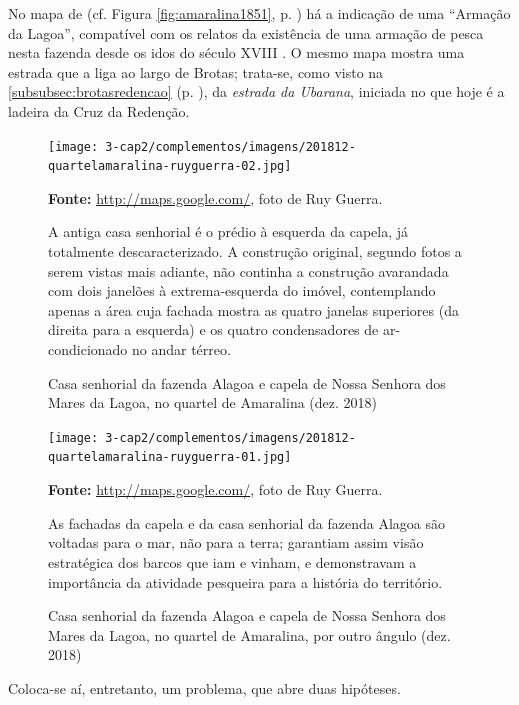 No mapa de  (cf. Figura \autoref{fig:amaralina1851}, p. \pageref{fig:amaralina1851}) há a indicação de uma ``Armação da Lagoa'', compatível com os relatos da existência de uma armação de pesca nesta fazenda desde os idos do século XVIII \cite[p.~120-121]{campos_alagoa_1942}. O mesmo mapa mostra uma estrada que a liga ao largo de Brotas; trata-se, como visto na \autoref{subsubsec:brotasredencao} (p. \pageref{subsubsec:brotasredencao}), da \textit{estrada da Ubarana}, iniciada no que hoje é a ladeira da Cruz da Redenção.

\begin{figure}
\caption{Casa senhorial da fazenda Alagoa e capela de Nossa Senhora dos Mares da Lagoa, no quartel de Amaralina (dez. 2018)}
\centering
\texttt{[image: 3-cap2/complementos/imagens/201812-quartelamaralina-ruyguerra-02.jpg]}{\footnotesize \par \textbf{Fonte:} \url{http://maps.google.com/}, foto de Ruy Guerra. \par A antiga casa senhorial é o prédio à esquerda da capela, já totalmente descaracterizado. A construção original, segundo fotos a serem vistas mais adiante, não continha a construção avarandada com dois janelões à extrema-esquerda do imóvel, contemplando apenas a área cuja fachada mostra as quatro janelas superiores (da direita para a esquerda) e os quatro condensadores de ar-condicionado no andar térreo.} 
\label{fig:2018-quartelamaralina02}
\end{figure}

\begin{figure}
\caption{Casa senhorial da fazenda Alagoa e capela de Nossa Senhora dos Mares da Lagoa, no quartel de Amaralina, por outro ângulo (dez. 2018)}
\centering
\texttt{[image: 3-cap2/complementos/imagens/201812-quartelamaralina-ruyguerra-01.jpg]}{\footnotesize \par \textbf{Fonte:} \url{http://maps.google.com/}, foto de Ruy Guerra. \par As fachadas da capela e da casa senhorial da fazenda Alagoa são voltadas para o mar, não para a terra; garantiam assim visão estratégica dos barcos que iam e vinham, e demonstravam a importância da atividade pesqueira para a história do território.} 
\label{fig:2018-quartelamaralina01}
\end{figure}

Coloca-se aí, entretanto, um problema, que abre duas hipóteses.


